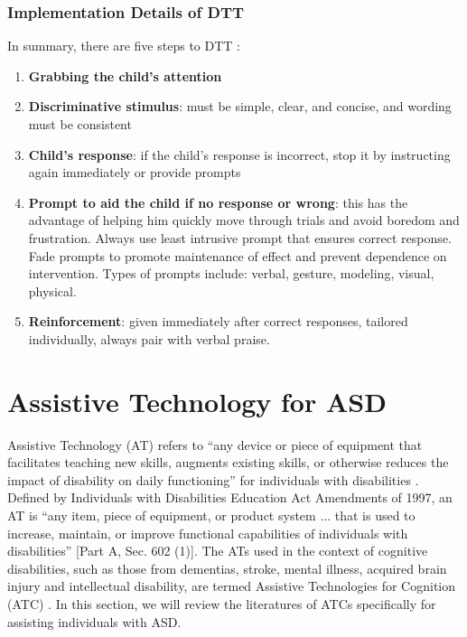 \documentclass{ut-thesis}
\begin{document}
\subsubsection{Implementation Details of DTT}
In summary, there are five steps to DTT \cite{bogin2010steps}:
\begin{enumerate}
	\item \textbf{Grabbing the child's attention}
	\item \textbf{Discriminative stimulus}: must be simple, clear, and concise, and wording must be consistent
	\item \textbf{Child's response}: if the child's response is incorrect, stop it by instructing again immediately or provide prompts
	\item \textbf{Prompt to aid the child if no response or wrong}: this has the advantage of helping him quickly move through trials and avoid boredom and frustration.  Always use least intrusive prompt that ensures correct response.  Fade prompts to promote maintenance of effect and prevent dependence on intervention.  Types of prompts include: verbal, gesture, modeling, visual, physical.
	\item \textbf{Reinforcement}: given immediately after correct responses, tailored individually, always pair with verbal praise.
\end{enumerate}

\section{Assistive Technology for ASD}
Assistive Technology (AT) refers to ``any device or piece of equipment that facilitates teaching new skills, augments existing skills, or otherwise reduces the impact of disability on daily functioning'' for individuals with disabilities \cite{lang2014assistive}.  Defined by Individuals with Disabilities Education Act Amendments of 1997, an AT is ``any item, piece of equipment, or product system ... that is used to increase, maintain, or improve functional capabilities of individuals with disabilities'' \cite{congress1997individuals} [Part A, Sec. 602 (1)].  The ATs used in the context of cognitive disabilities, such as those from dementias, stroke, mental illness, acquired brain injury and intellectual disability, are termed Assistive Technologies for Cognition (ATC) \cite{frank2004assistive}.  In this section, we will review the literatures of ATCs specifically for assisting individuals with ASD.
\end{document}
